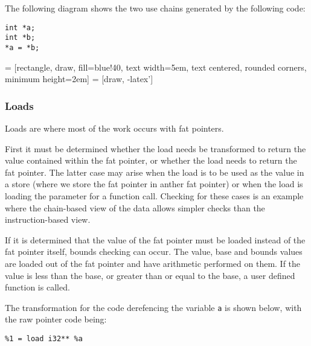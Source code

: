 The following diagram shows the two use chains generated by the following code:

\begin{verbatim}
int *a;
int *b;
*a = *b;
\end{verbatim}
 = [rectangle, draw, fill=blue!40, 
    text width=5em, text centered, rounded corners, minimum height=2em]
 = [draw, -latex']

\subsubsection{Loads}

Loads are where most of the work occurs with fat pointers.

First it must be determined whether the load needs be transformed to return the value contained within the fat pointer, or whether the load needs to return the fat pointer.
The latter case may arise when the load is to be used as the value in a store (where we store the fat pointer in anther fat pointer) or when the load is loading the parameter for a function call.
Checking for these cases is an example where the chain-based view of the data allows simpler checks than the instruction-based view.

If it is determined that the value of the fat pointer must be loaded instead of the fat pointer itself, bounds checking can occur.
The value, base and bounds values are loaded out of the fat pointer and have arithmetic performed on them.
If the value is less than the base, or greater than or equal to the base, a user defined function is called.

The transformation for the code derefencing the variable \verb!a! is shown below, with the raw pointer code being:

\begin{verbatim}
%1 = load i32** %a
\end{verbatim}

